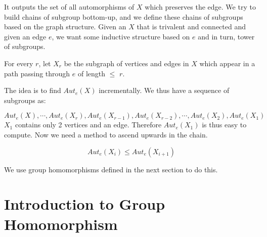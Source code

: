   
 It outputs the set of all automorphisms of  $X$ which preserves the edge. We try to build chains of subgroup bottom-up, and we define these chains of subgroups based on the graph structure. Given an $X$ that is trivalent and connected and given an edge $e$, we want some inductive structure based on $e$ and in turn, tower of subgroups.
  

For every $r$, let $X_r$ be the subgraph of vertices and edges in $X$ which appear in a path passing through $e$ of length $\leqslant$ $r$.


The idea is to find $Aut_e(X)$ incrementally.
We thus have a sequence of subgroups as:

 \[ Aut_e(X),\cdots  ,Aut_e(X_{r}),Aut_e(X_{r-1}),Aut_e(X_{r-2}),\cdots ,Aut_e(X_{2}),Aut_e(X_{1})\]
$X_{1}$ contains only 2 vertices and an edge. Therefore $Aut_e(X_{1})$ is thus easy to compute. Now we need a method to ascend upwards in the chain.
 
 \begin{observation} \[Aut_e(X_i) \leqslant Aut_e(X_{i+1})\]
 \end{observation}
 
 
% 
% 
% 
% 
% 
% 
% 

We use group homomorphisms defined in the next section to do this.

 \section{Introduction to Group Homomorphism}
 
